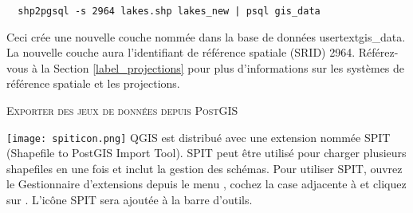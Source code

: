 \begin{verbatim}
  shp2pgsql -s 2964 lakes.shp lakes_new | psql gis_data
\end{verbatim}

Ceci crée une nouvelle couche nommée  dans la base de données usertext{gis\_data}. La nouvelle couche aura l'identifiant de référence spatiale (SRID) 2964. Référez-vous à la Section \ref{label_projections} pour plus d'informations sur les systèmes de référence spatiale et les projections.
\begin{Astuce}
\caption{\textsc{Exporter des jeux de données depuis PostGIS}}
\end{Astuce}

\texttt{[image: spiticon.png]} QGIS est distribué avec une extension nommée SPIT (Shapefile to PostGIS Import Tool). SPIT peut être utilisé pour charger plusieurs shapefiles en une fois et inclut la gestion des schémas. Pour utiliser SPIT, ouvrez le Gestionnaire d'extensions depuis le menu , cochez la case adjacente à  et cliquez sur . L'icône SPIT sera ajoutée à la barre d'outils.

